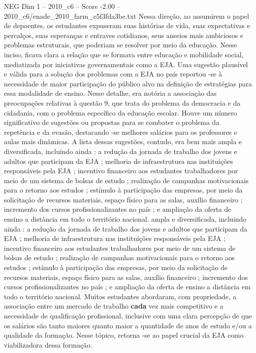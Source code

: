 \begin{textsample}{NEG Dim 1 – 2010\_c6 – Score -2.00 – 2010\_c6/enade\_2010\_farm\_c5f3fda3be.txt}
Nessa direção, ao assumirem o papel de depoentes, os estudantes expuseram suas histórias de vida, suas expectativas e percalços, suas esperanças e entraves cotidianos, seus anseios mais ambiciosos e problemas estruturais, que poderiam se resolver por meio da educação.
Nesse inciso, ficava clara a relação que se formava entre educação e mobilidade social, mediatizada por iniciativas governamentais como a EJA.
Uma sugestão plausível e válida para a solução dos problemas com a EJA no país reportou -se à necessidade de maior participação do público alvo na definição de estratégias para essa modalidade de ensino.
Nesse detalhe, era notória a associação das preocupações relativas à questão 9, que trata do problema da democracia e da cidadania, com o problema específico da educação escolar.
Houve um número significativo de sugestões ou propostas para se combater o problema da repetência e da evasão, destacando -se melhores salários para os professores e aulas mais dinâmicas.
A lista dessas sugestões, contudo, era bem mais ampla e diversificada, incluindo ainda : a redução da jornada de trabalho dos jovens e adultos que participam da EJA ; melhoria de infraestrutura nas instituições responsáveis pela EJA ; incentivo financeiro aos estudantes trabalhadores por meio de um sistema de bolsas de estudo ; realização de campanhas motivacionais para o retorno aos estudos ; estímulo à participação das empresas, por meio da solicitação de recursos materiais, espaço físico para as salas, auxílio financeiro ; incremento dos cursos profissionalizantes no país ; e ampliação da oferta de ensino a distância em todo o território nacional. ampla e diversificada, incluindo ainda : a redução da jornada de trabalho dos jovens e adultos que participam da EJA ; melhoria de infraestrutura nas instituições responsáveis pela EJA ; incentivo financeiro aos estudantes trabalhadores por meio de um sistema de bolsas de estudo ; realização de campanhas motivacionais para o retorno aos estudos ; estímulo à participação das empresas, por meio da solicitação de recursos materiais, espaço físico para as salas, auxílio financeiro ; incremento dos cursos profissionalizantes no país ; e ampliação da oferta de ensino a distância em todo o território nacional.
Muitos estudantes abordaram, com propriedade, a associação entre um mercado de trabalho \textbf{cada} vez mais competitivo e a necessidade de qualificação profissional, inclusive com uma clara percepção de que os salários são tanto maiores quanto maior a quantidade de anos de estudo e/ou a qualidade da formação.
Nesse tópico, retorna -se ao papel crucial da EJA como viabilizadora dessa formação.

\end{textsample}
